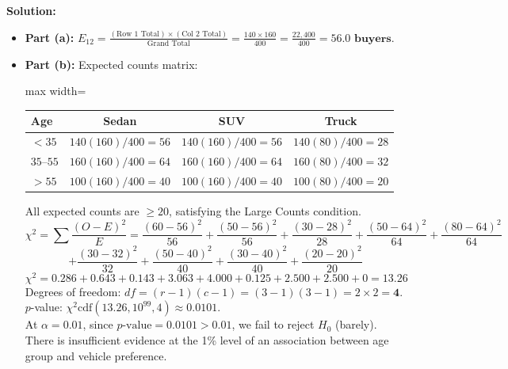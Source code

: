 \textbf{Solution:}
\begin{itemize}[leftmargin=1.2em]
  \item \textbf{Part (a):} $E_{12} = \frac{(\text{Row 1 Total}) \times (\text{Col 2 Total})}{\text{Grand Total}} = \frac{140 \times 160}{400} = \frac{22,400}{400} = \mathbf{56.0\text{ buyers}}$.
  \item \textbf{Part (b):}
  Expected counts matrix:
  \begin{center}
  \begin{adjustbox}{max width=\linewidth}
  \begin{tabular}{lccc}
  \toprule
  \textbf{Age} & \textbf{Sedan} & \textbf{SUV} & \textbf{Truck} \\
  \midrule
  $< 35$ & $140(160)/400 = 56$ & $140(160)/400 = 56$ & $140(80)/400 = 28$ \\
  $35\text{--}55$ & $160(160)/400 = 64$ & $160(160)/400 = 64$ & $160(80)/400 = 32$ \\
  $> 55$ & $100(160)/400 = 40$ & $100(160)/400 = 40$ & $100(80)/400 = 20$ \\
  \bottomrule
  \end{tabular}
  \end{adjustbox}
  \end{center}
  All expected counts are $\ge 20$, satisfying the Large Counts condition.\\
  \[ \chi^2 = \sum \frac{(O - E)^2}{E} = \frac{(60-56)^2}{56} + \frac{(50-56)^2}{56} + \frac{(30-28)^2}{28} + \frac{(50-64)^2}{64} + \frac{(80-64)^2}{64} \]
  \[ + \frac{(30-32)^2}{32} + \frac{(50-40)^2}{40} + \frac{(30-40)^2}{40} + \frac{(20-20)^2}{20} \]
  \[ \chi^2 = 0.286 + 0.643 + 0.143 + 3.063 + 4.000 + 0.125 + 2.500 + 2.500 + 0 = \mathbf{13.26} \]
  Degrees of freedom: $df = (r - 1)(c - 1) = (3 - 1)(3 - 1) = 2 \times 2 = \mathbf{4}$.\\
  $p$-value: $\chi^2\text{cdf}(13.26, 10^{99}, 4) \approx \mathbf{0.0101}$.\\
  At $\alpha = 0.01$, since $p\text{-value} = 0.0101 > 0.01$, we fail to reject $H_0$ (barely). There is insufficient evidence at the 1\% level of an association between age group and vehicle preference.
\end{itemize}

